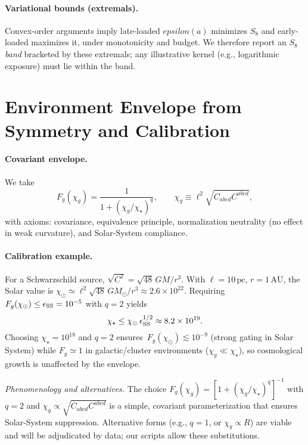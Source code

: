 \documentclass[aps,prd,onecolumn,superscriptaddress,nofootinbib]{revtex4-2}
\def\eps{epsilon}%
\providecommand{\eps}{\varepsilon}
\providecommand{\be}{\begin{equation}}
\providecommand{\ee}{\end{equation}}
\begin{document}
\paragraph{Variational bounds (extremals).}
Convex-order arguments imply late-loaded \(\eps(a)\) minimizes \(S_8\) and early-loaded maximizes it, under monotonicity and budget. We therefore report an \(S_8\) \emph{band} bracketed by these extremals; any illustrative kernel (e.g., logarithmic exposure) must lie within the band.

\section{Environment Envelope from Symmetry and Calibration}
\label{sec:env}

\paragraph{Covariant envelope.}
We take
\be
F_g(\chi_g)=\frac{1}{1+(\chi_g/\chi_\star)^q},\qquad \chi_g\equiv \ell^2\sqrt{C_{abcd}C^{abcd}},
\ee
with axioms: covariance, equivalence principle, normalization neutrality (no effect in weak curvature), and Solar-System compliance.

\paragraph{Calibration example.}
For a Schwarzschild source, \(\sqrt{C^2}=\sqrt{48}\,GM/r^3\). With \(\ell=10\,\mathrm{pc}\), \(r=1\,\mathrm{AU}\), the Solar value is \(\chi_\odot\simeq \ell^2 \sqrt{48}\,GM_\odot/r^3\approx 2.6\times 10^{22}\). Requiring \(F_g(\chi_\odot)\le \epsilon_{\rm SS}=10^{-5}\) with \(q=2\) yields
\be
\chi_\star \le \chi_\odot\,\epsilon_{\rm SS}^{1/2}\approx 8.2\times 10^{19}.
\ee
Choosing \(\chi_\star=10^{18}\) and \(q=2\) ensures \(\,F_g(\chi_\odot)\lesssim 10^{-9}\) (strong gating in Solar System) while \(F_g\simeq 1\) in galactic/cluster environments (\(\chi_g\ll \chi_\star\)), so cosmological growth is unaffected by the envelope.

\emph{Phenomenology and alternatives.} The choice \(F_g(\chi_g)=[1+(\chi_g/\chi_\star)^q]^{-1}\) with \(q=2\) and \(\chi_g\propto \sqrt{C_{abcd}C^{abcd}}\) is a simple, covariant parameterization that ensures Solar-System suppression. Alternative forms (e.g., \(q=1\), or \(\chi_g\propto R\)) are viable and will be adjudicated by data; our scripts allow these substitutions.
\end{document}
